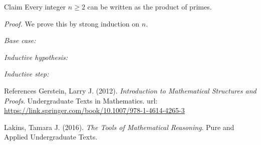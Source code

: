 \documentclass [aspectratio=169]{beamer}
\begin{document}
\begin{frame}
\begin{exampleblock}{Claim}
Every integer $n \geq 2$ can be written as the product of primes.
\end{exampleblock}

\textit{Proof.} We prove this by strong induction on $n$. \\
\vspace{1em}

{\it Base case:} \\ %
\vspace{2.5em}

{\it Inductive hypothesis:} \\  %
\vspace{2.5em}

{\it Inductive step:} \\
\vspace{4em}


\end{frame}




\begin{frame}{References}
Gerstein, Larry J. (2012). \textit{Introduction to Mathematical Structures and Proofs}. Undergraduate Texts in Mathematics. url: \href{https://link.springer.com/book/10.1007/978-1-4614-4265-3}{https://link.springer.com/book/10.1007/978-1-4614-4265-3}


\vspace{1em}

Lakins, Tamara J. (2016). \textit{The Tools of Mathematical Reasoning}. Pure and Applied Undergraduate Texts. 


\end{frame}
\end{document}
